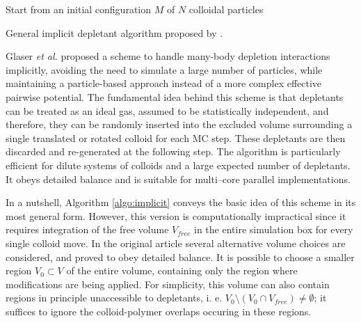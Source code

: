 \begin{algorithm}[h]
    \SetAlgoLined

    Start from an initial configuration $M$ of $N$ colloidal particles\;
    \caption{General implicit depletant algorithm proposed by \cite{glaser2015parallel}.}
    \label{algo:implicit}
\end{algorithm}

Glaser {\em et al.} \cite{glaser2015parallel} proposed a scheme to handle many-body depletion interactions implicitly, avoiding the need to simulate a large number of particles, while maintaining a particle-based approach instead of a more complex effective pairwise potential. The fundamental idea behind this scheme is that depletants can be treated as an ideal gas, assumed to be statistically independent, and therefore, they can be randomly inserted into the excluded volume surrounding a single translated or rotated colloid for each MC step. These depletants are then discarded and re-generated at the following step. The algorithm is particularly efficient for dilute systems of colloids and a large expected number of depletants. It obeys detailed balance and is suitable for multi--core parallel implementations.

In a nutshell, Algorithm \ref{algo:implicit} conveys the basic idea of this scheme in its most general form. However, this version is computationally impractical since it requires integration of the free volume $V_{free}$ in the entire simulation box for every single colloid move. In the original article \cite{glaser2015parallel} several alternative volume choices are considered, and proved to obey detailed balance. It is possible to choose a smaller region $V_0 \subset V$ of the entire volume, containing only the region where modifications are being applied. For simplicity, this volume can also contain regions in principle unaccessible to depletants, i. e. $V_0 \setminus (V_0 \cap V_{free}) \neq \emptyset$; it suffices to ignore the colloid-polymer overlaps occuring in these regions.

